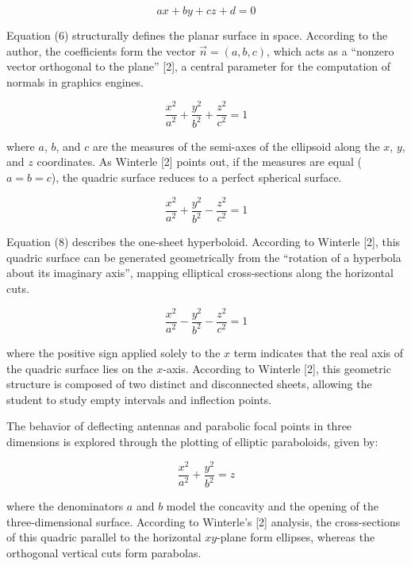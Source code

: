 \documentclass[conference,a4paper]{IEEEtran}
\begin{document}
\begin{equation}
ax + by + cz + d = 0 \tag{6}
\end{equation}

Equation (6) structurally defines the planar surface in space. According to the author, the coefficients form the vector $\vec{n}=(a,b,c)$, which acts as a ``nonzero vector orthogonal to the plane'' [2], a central parameter for the computation of normals in graphics engines.

\begin{equation}
\frac{x^2}{a^2}+\frac{y^2}{b^2}+\frac{z^2}{c^2} = 1 \tag{7}
\end{equation}

where $a$, $b$, and $c$ are the measures of the semi-axes of the ellipsoid along the $x$, $y$, and $z$ coordinates. As Winterle [2] points out, if the measures are equal ($a = b = c$), the quadric surface reduces to a perfect spherical surface.

\begin{equation}
\frac{x^2}{a^2}+\frac{y^2}{b^2}-\frac{z^2}{c^2} = 1 \tag{8}
\end{equation}

Equation (8) describes the one-sheet hyperboloid. According to Winterle [2], this quadric surface can be generated geometrically from the ``rotation of a hyperbola about its imaginary axis'', mapping elliptical cross-sections along the horizontal cuts.

\begin{equation}
\frac{x^2}{a^2}-\frac{y^2}{b^2}-\frac{z^2}{c^2} = 1 \tag{9}
\end{equation}

where the positive sign applied solely to the $x$ term indicates that the real axis of the quadric surface lies on the $x$-axis. According to Winterle [2], this geometric structure is composed of two distinct and disconnected sheets, allowing the student to study empty intervals and inflection points.

The behavior of deflecting antennas and parabolic focal points in three dimensions is explored through the plotting of elliptic paraboloids, given by:

\begin{equation}
\frac{x^2}{a^2}+\frac{y^2}{b^2} = z \tag{10}
\end{equation}

where the denominators $a$ and $b$ model the concavity and the opening of the three-dimensional surface. According to Winterle's [2] analysis, the cross-sections of this quadric parallel to the horizontal $xy$-plane form ellipses, whereas the orthogonal vertical cuts form parabolas.
\end{document}
